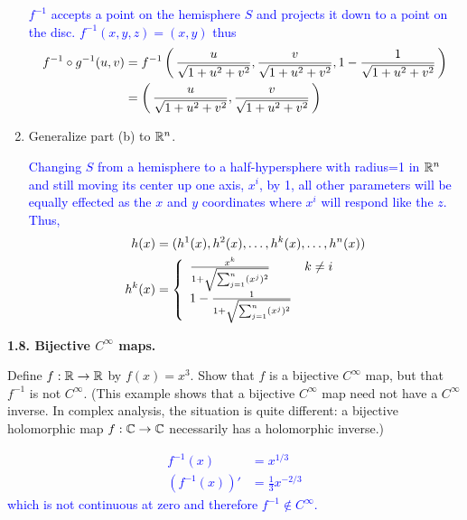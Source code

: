 \documentclass[10pt,a4paper]{report}
\newcommand{\BLUE}[1]{\textcolor{blue}{#1}}
\begin{document}
\begin{enumerate}[label=(\alph*)]
	\BLUE{$f^{-1}$ accepts a point on the hemisphere $S$ and projects it down to a point on the disc.  $f^{-1}(x,y,z) = (x,y)$ thus
	\begin{align*}
		f^{-1}\circ g^{-1} (u,v) &= f^{-1}\left (\, \frac{u}{\sqrt{1+u^2+v^2}}, \frac{v}{\sqrt{1+u^2+v^2}}, 1-\frac{1}{\sqrt{1+u^2+v^2}} \,\right ) \\
		&= \left (\, \frac{u}{\sqrt{1+u^2+v^2}}, \frac{v}{\sqrt{1+u^2+v^2}} \,\right )
	\end{align*}	
	}
	
	\item Generalize part (b) to $\mathbb{R}^n$. 
	
	\BLUE{Changing $S$ from a hemisphere to a half-hypersphere with radius=1 in $\mathbb{R}^n$ and still moving its center up one axis, $x^i$, by 1, all other parameters will be equally effected as the $x$ and $y$ coordinates where $x^i$ will respond like the $z$.  Thus,
	\begin{align*}
		h(x) &= (h^1(x), h^2(x), \dots, h^k(x), \dots, h^n(x)) \\
		h^k(x) &=  \left \{ \begin{array}{ll}  \frac{x^k}{1+\sqrt{\sum_{j=1}^n (x^j)^2}} & k \ne i\\ 1-\frac{1}{1+\sqrt{\sum_{j=1}^n (x^j)^2}} \end{array} \right .
	\end{align*}
	}
	
\end{enumerate}

\noindent \textbf{1.8. Bijective $C^\infty$ maps.}

\noindent Define $f: \mathbb{R} \to \mathbb{R}$ by $f(x)=x^3$.  Show that $f$ is a bijective $C^\infty$ map, but that $f^{-1}$ is not $C^\infty$.  (This example shows that a bijective $C^\infty$ map need not have a $C^\infty$ inverse.  In complex analysis, the situation is quite different: a bijective holomorphic map $f: \mathbb{C} \to \mathbb{C}$ necessarily has a holomorphic inverse.)

\BLUE{\begin{align*}
	f^{-1}(x) &= x^{1/3} \\
	(f^{-1}(x))' &= \frac{1}{3}x^{-2/3}
\end{align*}which is not continuous at zero and therefore $f^{-1} \not \in C^\infty$.
}
\end{document}
